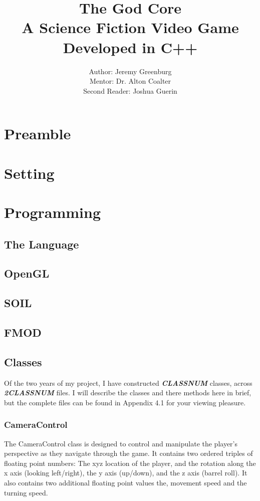 \documentclass{article}
\author{Author: Jeremy Greenburg \\ Mentor: Dr. Alton Coalter \\ Second Reader: Joshua Guerin}
\title{The God Core \\ A Science Fiction Video Game Developed in C++}
\begin{document}
\maketitle
\pagebreak

\tableofcontents

\pagebreak

\section{Preamble}

\section{Setting}

\section{Programming}

\subsection{The Language}

\subsection{OpenGL}

\subsection{SOIL}

\subsection{FMOD}

\subsection{Classes}

Of the two years of my project, I have constructed \textbf{\textit{CLASSNUM}} classes, across \textbf{\textit{2CLASSNUM}} files. I will describe the classes and there methods here in brief, but the complete files can be found in Appendix 4.1 for your viewing pleasure.

\subsubsection{CameraControl}
The CameraControl class is designed to control and manipulate the player's perspective as they navigate through the game. It contains two ordered triples of floating point numbers: The xyz location of the player, and the rotation along the x axis (looking left/right), the y axis (up/down), and the z axis (barrel roll). It also contains two additional floating point values the, movement speed and the turning speed. 
\end{document}

